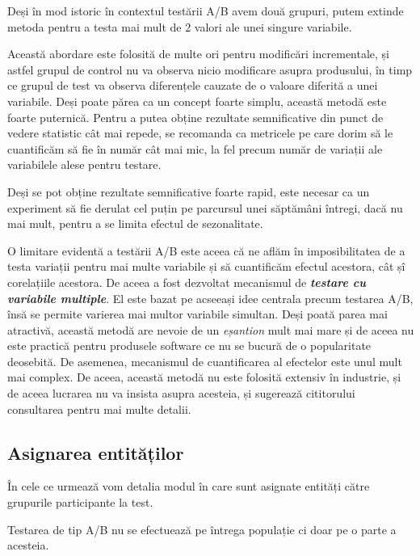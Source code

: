 \begin{remark}
	Deși în mod istoric în contextul testării A/B avem două grupuri, putem extinde metoda pentru a testa mai mult de 2 valori ale unei singure variabile.
\end{remark}

Această abordare este folosită de multe ori pentru modificări incrementale, și astfel grupul de control nu va observa nicio modificare asupra produsului, în timp ce grupul de test va observa diferențele cauzate de o valoare diferită a unei variabile. Deși poate părea ca un concept foarte simplu, această metodă este foarte puternică. Pentru a putea obține rezultate semnificative din punct de vedere statistic cât mai repede, se recomanda ca metricele pe care dorim să le cuantificăm să fie în număr cât mai mic, la fel precum număr de variații ale variabilele alese pentru testare.

\begin{remark}
	Deși se pot obține rezultate semnificative foarte rapid, este necesar ca un experiment să fie derulat cel puțin pe parcursul unei săptămâni întregi, dacă nu mai mult, pentru a se limita efectul de sezonalitate.
\end{remark}

O limitare evidentă a testării A/B este aceea că ne aflăm în imposibilitatea de a testa variații pentru mai multe variabile și să cuantificăm efectul acestora, cât șî corelațiile acestora. De aceea a fost dezvoltat mecanismul de \textbf{\textit{testare cu variabile multiple}}. El este bazat pe acseeași idee centrala precum testarea A/B, însă se permite varierea mai multor variabile simultan. Deși poată parea mai atractivă, această metodă are nevoie de un \textit{eșantion} mult mai mare și de aceea nu este practică pentru produsele software ce nu se bucură de o popularitate deosebită. De asemenea, mecanismul de cuantificarea al efectelor este unul mult mai complex. De aceea, această metodă nu este folosită extensiv în industrie, și de aceea lucrarea nu va insista asupra acesteia, și sugerează cititorului consultarea \cite{johnson1992applied} pentru mai multe detalii.

\subsection{Asignarea entităților}

În cele ce urmează vom detalia modul în care sunt asignate entități către grupurile participante la test.

\begin{remark}
	Testarea de tip A/B nu se efectuează pe întrega populație ci doar pe o parte a acesteia.
\end{remark}

